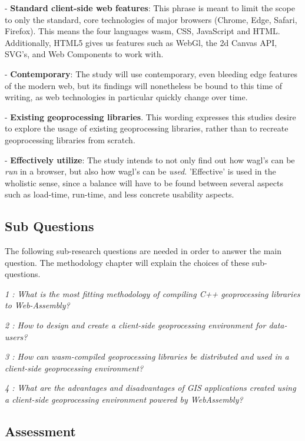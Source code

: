 - \textbf{Standard client-side web features}: This phrase is meant to limit the scope to only the standard, core technologies of major browsers (Chrome, Edge, Safari, Firefox). This means the four languages \ac{wasm}, CSS, JavaScript and HTML. Additionally, HTML5 gives us features such as WebGl, the 2d Canvas API, SVG's, and Web Components to work with.

- \textbf{Contemporary}: The study will use contemporary, even bleeding edge features of the modern web, but its findings will nonetheless be bound to this time of writing, as web technologies in particular quickly change over time. 

- \textbf{Existing geoprocessing libraries}. This wording expresses this studies desire to explore the usage of existing geoprocessing libraries, rather than to recreate geoprocessing libraries from scratch.

- \textbf{Effectively utilize}: The study intends to not only find out how wagl's can be \textit{run} in a browser, but also how wagl's can be \textit{used}. 'Effective' is used in the wholistic sense, since a balance will have to be found between several aspects such as load-time, run-time, and less concrete usability aspects. 


\subsection*{Sub Questions}

The following sub-research questions are needed in order to answer the main question. The methodology chapter will explain the choices of these sub-questions. 


\textit{1 : What is the most fitting methodology of compiling C++ geoprocessing   libraries to Web-Assembly?}

\textit{2 : How to design and create a client-side geoprocessing environment for data-users?}

\textit{3 : How can wasm-compiled geoprocessing libraries be distributed and used in a client-side geoprocessing environment?}

\textit{4 : What are the advantages and disadvantages of GIS applications created using a client-side geoprocessing environment powered by WebAssembly?}

\newpage
\subsection*{Assessment}

